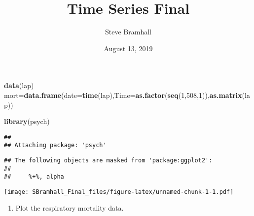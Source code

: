 \documentclass[]{article}
\title{Time Series Final}
\author{Steve Bramhall}
\date{August 13, 2019}
\newenvironment{Shaded}{\begin{snugshade}}{\end{snugshade}}
\newcommand{\KeywordTok}[1]{\textcolor[rgb]{0.13,0.29,0.53}{\textbf{#1}}}
\newcommand{\DataTypeTok}[1]{\textcolor[rgb]{0.13,0.29,0.53}{#1}}
\newcommand{\DecValTok}[1]{\textcolor[rgb]{0.00,0.00,0.81}{#1}}
\newcommand{\StringTok}[1]{\textcolor[rgb]{0.31,0.60,0.02}{#1}}
\newcommand{\CommentTok}[1]{\textcolor[rgb]{0.56,0.35,0.01}{\textit{#1}}}
\newcommand{\OtherTok}[1]{\textcolor[rgb]{0.56,0.35,0.01}{#1}}
\newcommand{\OperatorTok}[1]{\textcolor[rgb]{0.81,0.36,0.00}{\textbf{#1}}}
\newcommand{\NormalTok}[1]{#1}
\providecommand{\tightlist}{%
  \setlength{\itemsep}{0pt}\setlength{\parskip}{0pt}}
\begin{document}
\maketitle

\begin{Shaded}
\begin{Highlighting}[]
\KeywordTok{data}\NormalTok{(lap)}
\NormalTok{mort=}\KeywordTok{data.frame}\NormalTok{(}\DataTypeTok{date=}\KeywordTok{time}\NormalTok{(lap),}\DataTypeTok{Time=}\KeywordTok{as.factor}\NormalTok{(}\KeywordTok{seq}\NormalTok{(}\DecValTok{1}\NormalTok{,}\DecValTok{508}\NormalTok{,}\DecValTok{1}\NormalTok{)),}\KeywordTok{as.matrix}\NormalTok{(lap))}

\KeywordTok{library}\NormalTok{(psych)}
\end{Highlighting}
\end{Shaded}

\begin{verbatim}
## 
## Attaching package: 'psych'
\end{verbatim}

\begin{verbatim}
## The following objects are masked from 'package:ggplot2':
## 
##     %+%, alpha
\end{verbatim}

\begin{Shaded}
\end{Shaded}

\texttt{[image: SBramhall\_Final\_files/figure-latex/unnamed-chunk-1-1.pdf]}

\begin{enumerate}
\def\labelenumi{\arabic{enumi}.}
\tightlist
\item
  Plot the respiratory mortality data.
\end{enumerate}

\begin{Shaded}
\begin{Highlighting}[]

\end{Highlighting}
\end{Shaded}
\end{document}
